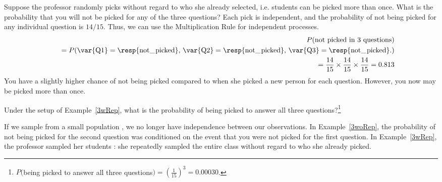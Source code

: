 \textPE{\pagebreak}

\begin{example}{Suppose the professor randomly picks without regard to who she already selected, i.e. students can be picked more than once. What is the probability that you will not be picked for any of the three questions?}\label{3wRep}
Each pick is independent, and the probability of not being picked for any individual question is $14/15$. Thus, we can use the Multiplication Rule for independent processes.
\begin{eqnarray*}
&&P(\text{not picked in 3 questions}) \\
&&\quad = P(\text{\var{Q1}} = \text{\resp{not\_\hspace{0.3mm}picked}, }\text{\var{Q2}} = \text{\resp{not\_\hspace{0.3mm}picked}, }\text{\var{Q3}} = \text{\resp{not\_\hspace{0.3mm}picked}.}) \\
&&\quad = \frac{14}{15}\times\frac{14}{15}\times\frac{14}{15} = 0.813
\end{eqnarray*}
You have a slightly higher chance of not being picked compared to when she picked a new person for each question. However, you now may be picked more than once.
\end{example}

\begin{exercise}
Under the setup of Example~\ref{3wRep}, what is the probability of being picked to answer all three questions?\footnote{$P($being picked to answer all three questions$) = \left(\frac{1}{15}\right)^3 = 0.00030$.}
\end{exercise}

If we sample from a small population , we no longer have independence between our observations. In Example~\ref{3woRep}, the probability of not being picked for the second question was conditioned on the event that you were not picked for the first question. In Example~\ref{3wRep}, the professor sampled her students : she repeatedly sampled the entire class without regard to who she already picked.

